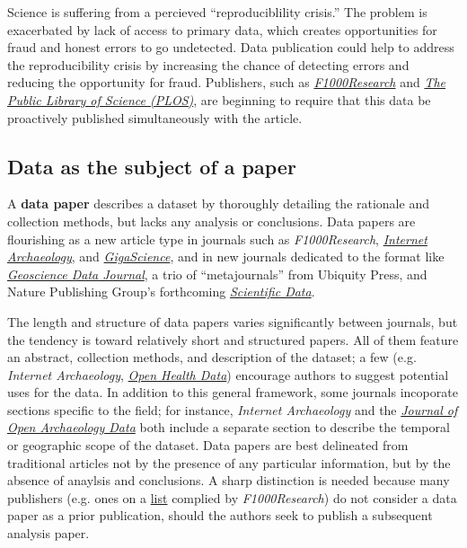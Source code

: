 \documentclass[10pt,a4paper,twocolumn]{article}
\begin{document}
Science is suffering from a percieved ``reproduciblility crisis.''\cite{mobley_survey_2013,pashler_is_2012,zimmer_rise_2012,hiltzik_science_2013,begley_drug_2012,collins_nih_2014}
The problem is exacerbated by lack of access to primary data, which creates opportunities for fraud and honest errors to go undetected.
Data publication could help to address the reproducibility crisis by increasing the chance of detecting errors and reducing the opportunity for fraud.\cite{drew_lost_2013}
Publishers, such as \href{http://f1000research.com}{\emph{F1000Research}} and \href{http://www.plos.org/}{\emph{The Public Library of Science (PLOS)}}\cite{bloom_data_2014}, are beginning to require that this data be proactively published simultaneously with the article.

% 


\subsection*{Data as the subject of a paper}\label{paper-subject-data}

A \textbf{data paper} describes a dataset by thoroughly detailing the rationale and collection methods, but lacks any analysis or conclusions.\cite{newman_data_2009} 
Data papers are flourishing as a new article type in journals such as \emph{F1000Research}, \href{http://www.internetarchaeology.org/}{\emph{Internet Archaeology}}, and \href{http://www.gigasciencejournal.com/}{\emph{GigaScience}}\cite{gigascience}, and in new journals dedicated to the format like \href{http://onlinelibrary.wiley.com/journal/10.1002/%28ISSN%292049-6060}{\emph{Geoscience Data Journal}}\cite{geoscience_data_journal}, a trio of ``metajournals'' from Ubiquity Press, and Nature Publishing Group's forthcoming \href{http://www.nature.com/scientificdata/}{\emph{Scientific Data}}.

The length and structure of data papers varies significantly between journals, but the tendency is toward relatively short and structured papers.
All of them feature an abstract, collection methods, and description of the dataset; a few (e.g. \emph{Internet Archaeology}, \href{http://openhealthdata.metajnl.com/about/submissions#authorGuidelines}{\emph{Open Health Data}}) encourage authors to suggest potential uses for the data.
In addition to this general framework, some journals incoporate sections specific to the field; for instance, \emph{Internet Archaeology} and the \href{http://openarchaeologydata.metajnl.com/}{\emph{Journal of Open Archaeology Data}} both include a separate section to describe the  temporal or geographic scope of the dataset.
Data papers are best delineated from traditional articles not by the presence of any particular information, but by the absence of anaylsis and conclusions.
A sharp distinction is needed because many publishers (e.g. ones on a \href{https://f1000research.com/data-policies}{list} complied by \emph{F1000Research}) do not consider a data paper as a prior publication, should the authors seek to publish a subsequent analysis paper.
\end{document}
